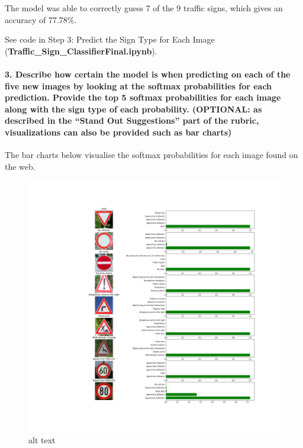 \documentclass[11pt]{article}
\makeatletter
\def\maxwidth{\ifdim\Gin@nat@width>\linewidth\linewidth
    \else\Gin@nat@width\fi}
\let\Oldincludegraphics\includegraphics
\renewcommand{\includegraphics}[1]{\Oldincludegraphics[width=.8\maxwidth]{#1}}
\makeatother
\begin{document}
The model was able to correctly guess 7 of the 9 traffic signs, which
gives an accuracy of 77.78\%.

See code in Step 3: Predict the Sign Type for Each Image
(\textbf{Traffic\_Sign\_ClassifierFinal.ipynb}).

\hypertarget{describe-how-certain-the-model-is-when-predicting-on-each-of-the-five-new-images-by-looking-at-the-softmax-probabilities-for-each-prediction.-provide-the-top-5-softmax-probabilities-for-each-image-along-with-the-sign-type-of-each-probability.-optional-as-described-in-the-stand-out-suggestions-part-of-the-rubric-visualizations-can-also-be-provided-such-as-bar-charts}{%
\paragraph{3. Describe how certain the model is when predicting on each
of the five new images by looking at the softmax probabilities for each
prediction. Provide the top 5 softmax probabilities for each image along
with the sign type of each probability. (OPTIONAL: as described in the
``Stand Out Suggestions'' part of the rubric, visualizations can also be
provided such as bar
charts)}\label{describe-how-certain-the-model-is-when-predicting-on-each-of-the-five-new-images-by-looking-at-the-softmax-probabilities-for-each-prediction.-provide-the-top-5-softmax-probabilities-for-each-image-along-with-the-sign-type-of-each-probability.-optional-as-described-in-the-stand-out-suggestions-part-of-the-rubric-visualizations-can-also-be-provided-such-as-bar-charts}}

The bar charts below visualise the softmax probabilities for each image
found on the web.

\begin{figure}
\centering
\includegraphics{./images/softmax_prob.png}
\caption{alt text}
\end{figure}
\end{document}

